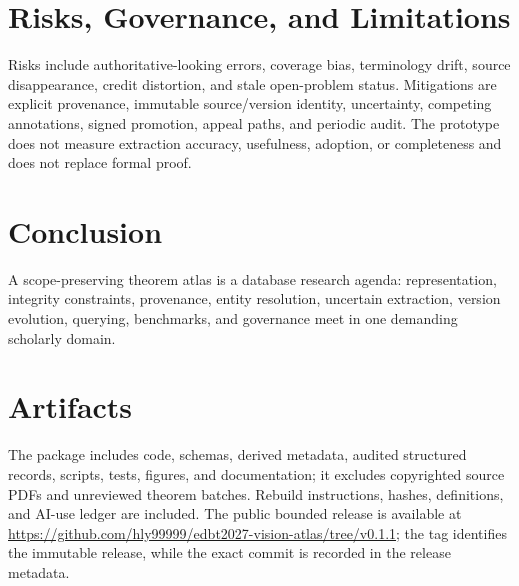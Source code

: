 \documentclass[sigconf,review]{official-template/acmart}
\begin{document}
\section{Risks, Governance, and Limitations} Risks include authoritative-looking errors, coverage bias, terminology drift, source disappearance, credit distortion, and stale open-problem status. Mitigations are explicit provenance, immutable source/version identity, uncertainty, competing annotations, signed promotion, appeal paths, and periodic audit. The prototype does not measure extraction accuracy, usefulness, adoption, or completeness and does not replace formal proof.
\section{Conclusion} A scope-preserving theorem atlas is a database research agenda: representation, integrity constraints, provenance, entity resolution, uncertain extraction, version evolution, querying, benchmarks, and governance meet in one demanding scholarly domain.
\section*{Artifacts} The package includes code, schemas, derived metadata, audited structured records, scripts, tests, figures, and documentation; it excludes copyrighted source PDFs and unreviewed theorem batches. Rebuild instructions, hashes, definitions, and AI-use ledger are included. The public bounded release is available at \url{https://github.com/hly99999/edbt2027-vision-atlas/tree/v0.1.1}; the tag identifies the immutable release, while the exact commit is recorded in the release metadata.
\balance

\end{document}
